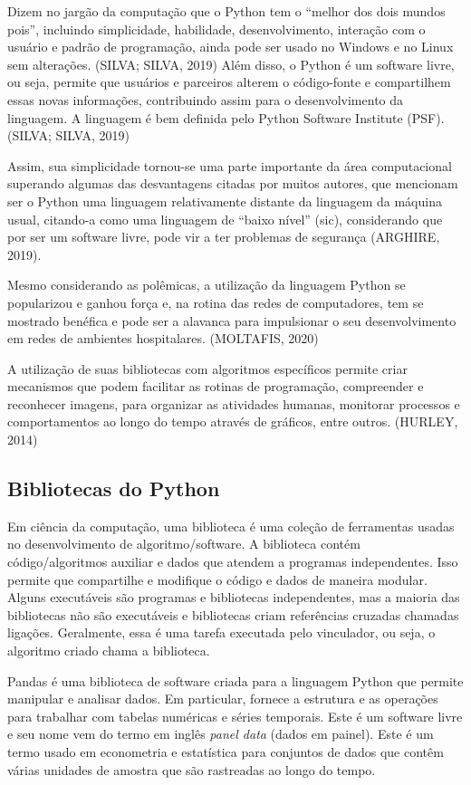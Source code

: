 \documentclass[
	12pt,				%
	openright,			%
	twoside,			%
	a4paper,			%
	english,			%
	french,				%
	spanish,			%
	brazil				%
	]{abntex2}
\begin{document}
Dizem no jargão da computação que o Python tem o “melhor dos dois mundos pois”, incluindo simplicidade, habilidade, desenvolvimento, interação com o usuário e padrão de programação, ainda pode ser usado no Windows e no Linux sem alterações. (SILVA; SILVA, 2019)
Além disso, o Python é um software livre, ou seja, permite que usuários e parceiros alterem o código-fonte e compartilhem essas novas informações, contribuindo assim para o desenvolvimento da linguagem. A linguagem é bem definida pelo Python Software Institute (PSF). (SILVA; SILVA, 2019) 

Assim, sua simplicidade tornou-se uma parte importante da área computacional superando algumas das desvantagens citadas por muitos autores, que mencionam ser o Python uma linguagem relativamente distante da linguagem da máquina usual, citando-a como uma linguagem de “baixo nível” (sic), considerando que por ser um software livre, pode vir a ter problemas de segurança (ARGHIRE, 2019).

Mesmo considerando as polêmicas, a utilização da linguagem Python se popularizou e ganhou força e, na rotina das redes de computadores, tem se mostrado benéfica e pode ser a alavanca para impulsionar o seu desenvolvimento em redes de ambientes hospitalares. (MOLTAFIS, 2020)

A utilização de suas bibliotecas com algoritmos específicos permite criar mecanismos que podem facilitar as rotinas de programação, compreender e reconhecer imagens, para organizar as atividades humanas, monitorar processos e comportamentos ao longo do tempo através de gráficos, entre outros. (HURLEY, 2014)

\subsection{Bibliotecas do Python}

Em ciência da computação, uma biblioteca é uma coleção de ferramentas usadas ​​no desenvolvimento de algoritmo/software. A biblioteca contém código/algoritmos auxiliar e dados que atendem a programas independentes. Isso permite que compartilhe e modifique o código e dados de maneira modular. Alguns executáveis ​​são programas e bibliotecas independentes, mas a maioria das bibliotecas não são executáveis ​​e bibliotecas criam referências cruzadas chamadas ligações. Geralmente, essa é uma tarefa executada pelo vinculador, ou seja, o algoritmo criado chama a biblioteca.

Pandas é uma biblioteca de software criada para a linguagem Python que permite manipular e analisar dados. Em particular, fornece a estrutura e as operações para trabalhar com tabelas numéricas e séries temporais. Este é um software livre e seu nome vem do termo em inglês \textit{panel data} (dados em painel). Este é um termo usado em econometria e estatística para conjuntos de dados que contêm várias unidades de amostra que são rastreadas ao longo do tempo.
\end{document}
